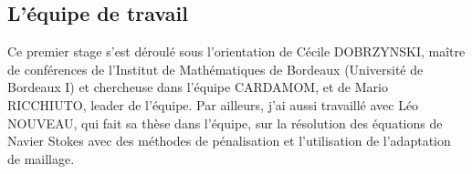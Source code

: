 \subsection{L'équipe de travail}

\indent Ce premier stage s'est déroulé sous l'orientation de Cécile DOBRZYNSKI, maître de conférences de l'Institut de Mathématiques de Bordeaux (Université de Bordeaux I) et chercheuse dans l'équipe CARDAMOM, et de Mario RICCHIUTO, leader de l'équipe. Par ailleurs, j'ai aussi travaillé avec Léo NOUVEAU, qui fait sa thèse dans l'équipe, sur la résolution des équations de Navier Stokes avec des méthodes de pénalisation et l'utilisation de l'adaptation de maillage.

%
%
